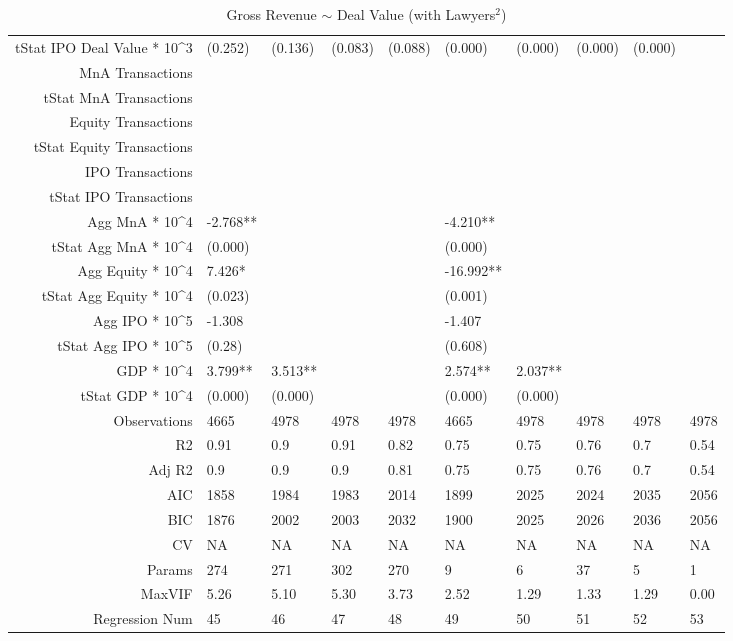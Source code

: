 \begin{table}[ht]
\begin{tabular}{rlllllllll}
  tStat IPO Deal Value * 10^3 & (0.252) & (0.136) & (0.083) & (0.088) & (0.000) & (0.000) & (0.000) & (0.000) &  \\ 
  MnA Transactions &  &  &  &  &  &  &  &  &  \\ 
  tStat MnA Transactions &  &  &  &  &  &  &  &  &  \\ 
  Equity Transactions &  &  &  &  &  &  &  &  &  \\ 
  tStat Equity Transactions &  &  &  &  &  &  &  &  &  \\ 
  IPO Transactions &  &  &  &  &  &  &  &  &  \\ 
  tStat IPO Transactions &  &  &  &  &  &  &  &  &  \\ 
  Agg MnA * 10^4 & -2.768** &  &  &  & -4.210** &  &  &  &  \\ 
  tStat Agg MnA * 10^4 & (0.000) &  &  &  & (0.000) &  &  &  &  \\ 
  Agg Equity * 10^4 & 7.426* &  &  &  & -16.992** &  &  &  &  \\ 
  tStat Agg Equity * 10^4 & (0.023) &  &  &  & (0.001) &  &  &  &  \\ 
  Agg IPO * 10^5 & -1.308 &  &  &  & -1.407 &  &  &  &  \\ 
  tStat Agg IPO * 10^5 & (0.28) &  &  &  & (0.608) &  &  &  &  \\ 
  GDP * 10^4 & 3.799** & 3.513** &  &  & 2.574** & 2.037** &  &  &  \\ 
  tStat GDP * 10^4 & (0.000) & (0.000) &  &  & (0.000) & (0.000) &  &  &  \\ 
  Observations & 4665 & 4978 & 4978 & 4978 & 4665 & 4978 & 4978 & 4978 & 4978 \\ 
  R2 & 0.91 & 0.9 & 0.91 & 0.82 & 0.75 & 0.75 & 0.76 & 0.7 & 0.54 \\ 
  Adj R2 & 0.9 & 0.9 & 0.9 & 0.81 & 0.75 & 0.75 & 0.76 & 0.7 & 0.54 \\ 
  AIC & 1858 & 1984 & 1983 & 2014 & 1899 & 2025 & 2024 & 2035 & 2056 \\ 
  BIC & 1876 & 2002 & 2003 & 2032 & 1900 & 2025 & 2026 & 2036 & 2056 \\ 
  CV & NA & NA & NA & NA & NA & NA & NA & NA & NA \\ 
  Params & 274 & 271 & 302 & 270 & 9 & 6 & 37 & 5 & 1 \\ 
  MaxVIF & 5.26 & 5.10 & 5.30 & 3.73 & 2.52 & 1.29 & 1.33 & 1.29 & 0.00 \\ 
  Regression Num & 45 & 46 & 47 & 48 & 49 & 50 & 51 & 52 & 53 \\ 
   \hline
\end{tabular}
\caption{Gross Revenue $\sim$ Deal Value (with Lawyers$^2$)} 
\end{table}
